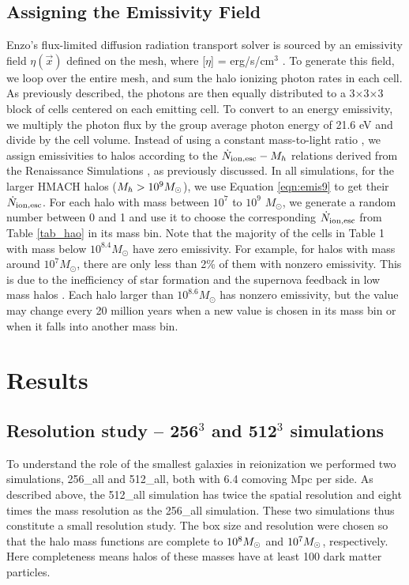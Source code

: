 \documentclass[iop,apj]{emulateapj}
\begin{document}
\subsection{Assigning the Emissivity Field}\label{input}
Enzo's flux-limited diffusion radiation transport solver is sourced by an emissivity field $\eta(\vec{x})$ defined on the mesh, where [$\eta$] = erg/s/cm$^3$ \citep{Norman13}. To generate this field, we loop over the entire mesh, and sum the halo ionizing photon rates in each cell. As previously described, the photons are then equally distributed to a 3$\times$3$\times$3 block of cells centered on each emitting cell.  To convert to an energy emissivity, we multiply the photon flux by the group average photon energy of 21.6 eV and divide by the cell volume.
Instead of using a constant mass-to-light ratio \citep{Iliev07}, we assign emissivities to halos according to the $\dot{N}_{\rm ion,esc}-M_h$ relations derived from the Renaissance Simulations \citep{Xu16}, as previously discussed. In all simulations, for the larger HMACH halos ($M_h>10^9M_\odot$), we use Equation \ref{eqn:emis9} to get their $\dot{N}_{\rm ion,esc}$. For each halo with mass between $10^7$ to $10^9$ $M_\odot$, we generate a random number between 0 and 1 and use it to choose the corresponding $\dot{N}_{\rm ion,esc}$ from Table \ref{tab_hao} in its mass bin. Note that the majority of the cells in Table 1 with mass below $10^{8.4}M_\odot$ have zero emissivity. For example, for halos with mass around $10^7M_\odot$, there are only less than 2\% of them with nonzero emissivity. This is due to the inefficiency of star formation and the supernova feedback in low mass halos \citep{Wyithe13}. Each halo larger than $10^{8.6}M_\odot$ has nonzero emissivity, but the value may change every 20 million years when a new value is chosen in its mass bin or when it falls into another mass bin. 

\section{Results}

\subsection{Resolution study -- 256$^3$ and 512$^3$ simulations}\label{resolution}
To understand the role of the smallest galaxies in reionization we performed two simulations, 256\_all and 512\_all, both with 6.4 comoving Mpc per side. As described above, the 512\_all simulation has twice the spatial resolution and eight times the mass resolution as the 256\_all simulation. 
These two simulations thus constitute a small resolution study. The box size and resolution were chosen so that the halo mass functions are complete to $10^8\Ms$ and $10^7\Ms$, respectively. Here completeness means halos of these masses have at least 100 dark matter particles. 
\end{document}
